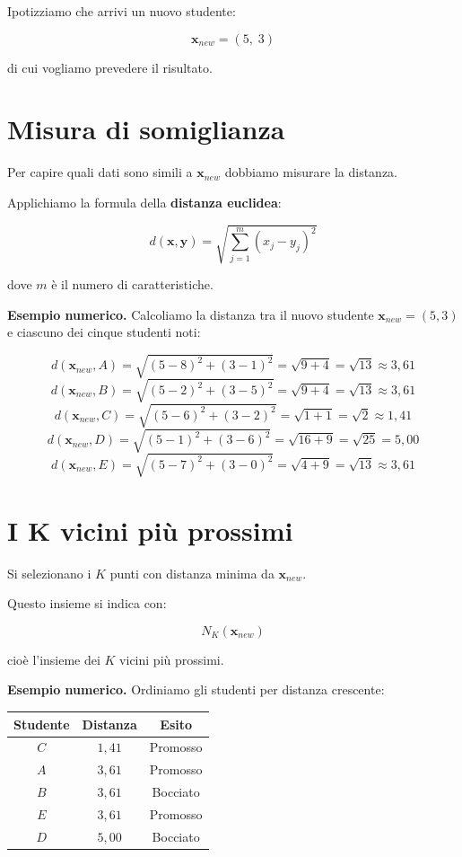 \documentclass{article}
\begin{document}
	Ipotizziamo che arrivi un nuovo studente:
	
	\[
	\mathbf{x}_{new} = (5,\; 3)
	\]
	
	di cui vogliamo prevedere il risultato.
	
	\section*{Misura di somiglianza}
	
	Per capire quali dati sono simili a $\mathbf{x}_{new}$ dobbiamo misurare la distanza.
	
	Applichiamo la formula della \textbf{distanza euclidea}:
	
	\[
	d(\mathbf{x}, \mathbf{y}) =
	\sqrt{
		\sum_{j=1}^{m}
		(x_j - y_j)^2
	}
	\]
	
	dove $m$ è il numero di caratteristiche.
	
	\textbf{Esempio numerico.} Calcoliamo la distanza tra il nuovo studente $\mathbf{x}_{new}=(5,3)$ e ciascuno dei cinque studenti noti:
	
	\[
	d(\mathbf{x}_{new}, A) = \sqrt{(5-8)^2 + (3-1)^2} = \sqrt{9+4} = \sqrt{13} \approx 3{,}61
	\]
	\[
	d(\mathbf{x}_{new}, B) = \sqrt{(5-2)^2 + (3-5)^2} = \sqrt{9+4} = \sqrt{13} \approx 3{,}61
	\]
	\[
	d(\mathbf{x}_{new}, C) = \sqrt{(5-6)^2 + (3-2)^2} = \sqrt{1+1} = \sqrt{2}  \approx 1{,}41
	\]
	\[
	d(\mathbf{x}_{new}, D) = \sqrt{(5-1)^2 + (3-6)^2} = \sqrt{16+9} = \sqrt{25} = 5{,}00
	\]
	\[
	d(\mathbf{x}_{new}, E) = \sqrt{(5-7)^2 + (3-0)^2} = \sqrt{4+9}  = \sqrt{13} \approx 3{,}61
	\]
	
	\section*{I K vicini più prossimi}
	
	Si selezionano i $K$ punti con distanza minima da $\mathbf{x}_{new}$.
	
	Questo insieme si indica con:
	
	\[
	N_K(\mathbf{x}_{new})
	\]
	
	cioè l'insieme dei $K$ vicini più prossimi.
	
	\textbf{Esempio numerico.} Ordiniamo gli studenti per distanza crescente:
	
	\begin{center}
		\begin{tabular}{ccc}
			\toprule
			Studente & Distanza & Esito \\
			\midrule
			$C$ & $1{,}41$ & Promosso \\
			$A$ & $3{,}61$ & Promosso \\
			$B$ & $3{,}61$ & Bocciato  \\
			$E$ & $3{,}61$ & Promosso  \\
			$D$ & $5{,}00$ & Bocciato  \\
			\bottomrule
		\end{tabular}
	\end{center}
	
\end{document}
